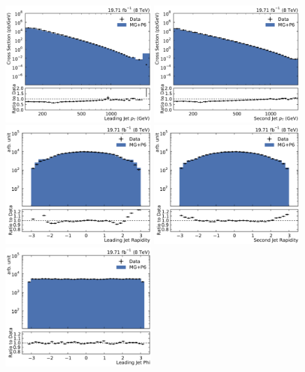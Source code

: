 \begin{figure}[htbp]
    \centering
    \includegraphics[width=0.49\textwidth]{figures/measurement/jet1pt_default.pdf}\hfill
    \includegraphics[width=0.49\textwidth]{figures/measurement/jet2pt_default.pdf}
    \includegraphics[width=0.49\textwidth]{figures/measurement/jet1rap_default.pdf}\hfill
    \includegraphics[width=0.49\textwidth]{figures/measurement/jet2rap_default.pdf}
    \includegraphics[width=0.49\textwidth]{figures/measurement/jet1phi_default.pdf}\hfill

\end{figure}
